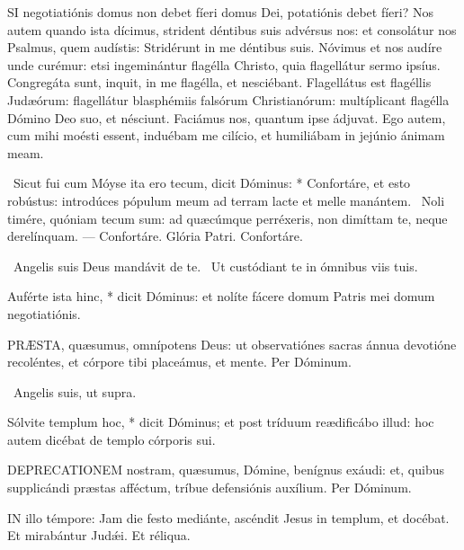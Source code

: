 
\lettrine[lines=2]{S}{I} negotiatiónis domus non debet fíeri domus Dei, potatiónis debet fíeri? Nos autem quando ista dícimus, strident déntibus suis advérsus nos: et consolátur nos Psalmus, quem audístis: Stridérunt in me déntibus suis. Nóvimus et nos audíre unde curémur: etsi ingeminántur flagélla Christo, quia flagellátur sermo ipsíus. Congregáta sunt, inquit, in me flagélla, et nesciébant. Flagellátus est flagéllis Judæórum: flagellátur blasphémiis falsórum Christianórum: multíplicant flagélla Dómino Deo suo, et nésciunt. Faciámus nos, quantum ipse ádjuvat. Ego autem, cum mihi moésti essent, induébam me cilício, et humiliábam in jejúnio ánimam meam.

\R\ Sicut fui cum Móyse ita ero tecum, dicit Dóminus: * Confortáre, et esto robústus: introdúces pópulum meum ad terram lacte et melle manántem. \V\ Noli timére, quóniam tecum sum: ad quæcúmque perréxeris, non dimíttam te, neque derelínquam. --- Confortáre. Glória Patri. Confortáre.

\V\ Angelis suis Deus mandávit de te. \R\ Ut custódiant te in ómnibus viis tuis.

 Auférte ista hinc, * dicit Dóminus: et nolíte fácere domum Patris mei domum negotiatiónis.


\lettrine[lines=2]{P}{RÆSTA}, quæsumus, omnípotens Deus: ut observatiónes sacras ánnua devotióne recoléntes, et córpore tibi placeámus, et mente. Per Dóminum.

\V\ Angelis suis, ut supra.

 Sólvite templum hoc, * dicit Dóminus; et post tríduum reædificábo illud: hoc autem dicébat de templo córporis sui.


\lettrine[lines=2]{D}{EPRECATIONEM} nostram, quæsumus, Dómine, benígnus exáudi: et, quibus supplicándi præstas afféctum, tríbue defensiónis auxílium. Per Dóminum.

\sectionornament




\lettrine[lines=2]{I}{N} illo témpore: Jam die festo mediánte, ascéndit Jesus in templum, et docébat. Et mirabántur Judǽi. Et réliqua.

